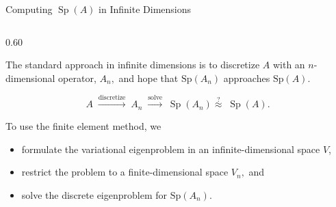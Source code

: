 \documentclass[aspectratio=169]{beamer}
\begin{document}
\begin{frame}{Computing \(\operatorname{Sp}(A)\) in Infinite Dimensions}

\begin{columns}[T,onlytextwidth]

\begin{column}{0.60\textwidth}

The standard approach in infinite dimensions is to discretize $A$ with an $n$-dimensional operator, $A_n,$ and hope that $\text{Sp}(A_n)$ approaches $\text{Sp}(A).$


\vspace{0.2cm}

\[
A
\;\xrightarrow{\text{discretize}}\;
A_n
\;\xrightarrow{\text{solve}}\;
\operatorname{Sp}(A_n)
\stackrel{?}{\approx}\;
\operatorname{Sp}(A).
\]

\vspace{0.3cm}

To use the finite element method, we
\begin{itemize}
    \item formulate the variational eigenproblem in an infinite-dimensional space \(V\),
    \item restrict the problem to a finite-dimensional space $V_n,$ and
    \item solve the discrete eigenproblem for $\text{Sp}(A_n).$
\end{itemize}

\vspace{0.2cm}

\end{column}


\end{columns}
\end{frame}
\end{document}
